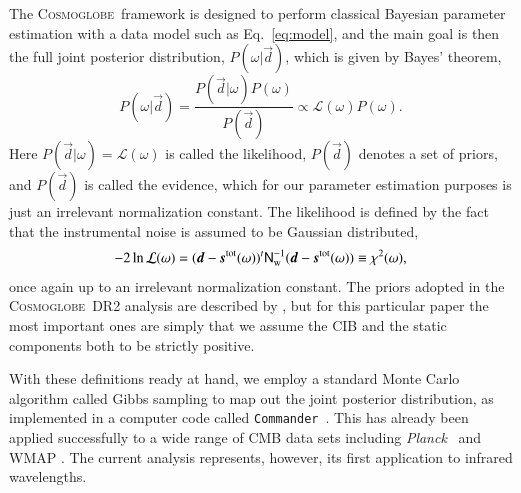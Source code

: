 \documentclass{aa}
\def\commander{\texttt{Commander}}
\def\Planck{\textit{Planck}}
\newcommand{\dv}[0]{\vec{d}}
\newcommand{\s}[0]{\vec{s}}
\newcommand{\N}[0]{\tens{N}}
\newcommand{\cosmoglobe}{\textsc{Cosmoglobe}}
\begin{document}

The \cosmoglobe\ framework is designed to perform classical Bayesian
parameter estimation with a data model such as Eq.~\eqref{eq:model},
and the main goal is then the full joint posterior distribution,
$P(\omega|\dv)$, which is given by Bayes' theorem,
\begin{equation}
P(\omega|\dv) = \frac{P(\dv|\omega) P(\omega)}{P(\dv)} \propto
\mathcal{L}(\omega) P(\omega).
\end{equation}
Here $P(\dv|\omega) = \mathcal{L}(\omega)$ is called the likelihood,
$P(\dv)$ denotes a set of priors, and $P(\dv)$ is called the evidence,
which for our parameter estimation purposes is just an irrelevant
normalization constant. The likelihood is defined by the fact that the
instrumental noise is assumed to be Gaussian distributed,
\begin{equation}
-2\ln\mathcal{L}(\omega) = (\dv-\s^{\mathrm{tot}}(\omega))^t
  \N_{\mathrm{w}}^{-1}(\dv-\s^{\mathrm{tot}}(\omega)) \equiv \chi^2(\omega),
\end{equation}
once again up to an irrelevant normalization constant. The priors
adopted in the \cosmoglobe\ DR2 analysis are described by
\citet{CG02_01,CG02_02,CG02_04}, but for this particular paper the
most important ones are simply that we assume the CIB and the
static components both to be strictly positive. 

With these definitions ready at hand, we employ a standard Monte Carlo
algorithm called Gibbs sampling \citep[e.g.,][]{geman:1984} to map out
the joint posterior distribution, as implemented in a computer code
called \commander\ \citep{eriksen:2004,seljebotn:2019,bp03}. This has
already been applied successfully to a wide range of CMB data sets
including \Planck\ \citep{planck2014-a12,bp01} and WMAP
\citep{watts2023_dr1}. The current analysis represents, however, its first
application to infrared wavelengths.
\end{document}
